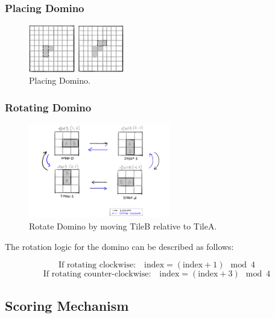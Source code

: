 \documentclass[conference]{IEEEtran}
\begin{document}
\subsubsection{Placing Domino}

\begin{figure}[htbp]
    \centerline{\includegraphics[width=0.18\textwidth]{assets/placing-1.png}}
    \centerline{\includegraphics[width=0.18\textwidth]{assets/placing-2.png}}
    \caption{Placing Domino.}\label{fig:placing}
\end{figure}

\subsubsection{Rotating Domino}

\begin{figure}[htbp]
    \centerline{\includegraphics[width=0.55\textwidth]{assets/rotate.png}}
    \caption{Rotate Domino by moving TileB relative to TileA.}\label{fig:rotate}
\end{figure}

The rotation logic for the domino can be described as follows:

\[
    \text{If rotating clockwise:} \quad\boxed{\text{index} = (\text{index} + 1) \mod 4}
\]
\[
    \text{If rotating counter-clockwise:} \quad\boxed{\text{index} = (\text{index} + 3) \mod 4}
\]

\subsection{Scoring Mechanism}
\end{document}
